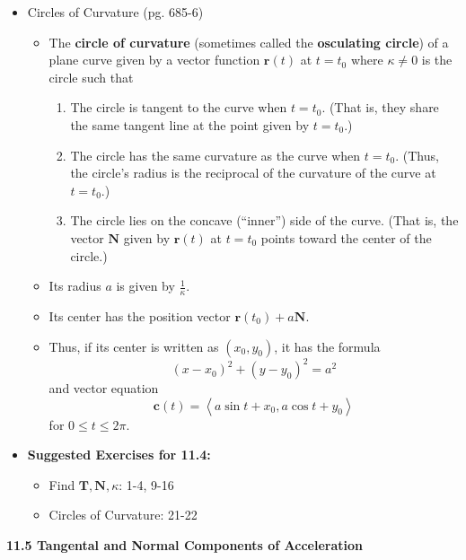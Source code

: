 \documentclass[12pt]{article}
\renewcommand{\vec}[1]{\mathbf{#1}}
\newcommand{\<}{\left<}
\renewcommand{\>}{\right>}
\begin{document}
\begin{itemize}
  \item Circles of Curvature (pg. 685-6)
  
    \begin{itemize}
    \item The \textbf{circle of curvature} (sometimes called the \textbf{osculating circle}) of a plane curve given by a vector function $\vec{r}(t)$ at $t=t_0$ where $\kappa\not=0$ is the circle such that
      \begin{enumerate}
      \item The circle is tangent to the curve when $t=t_0$. (That is, they share the same tangent line at the point given by $t=t_0$.)
      \item The circle has the same curvature as the curve when $t=t_0$. (Thus, the circle's radius is the reciprocal of the curvature of the curve at $t=t_0$.)
      \item The circle lies on the concave (``inner'') side of the curve. (That is, the vector $\vec{N}$ given by $\vec{r}(t)$ at $t=t_0$ points toward the center of the circle.)
      \end{enumerate}
    \item Its radius $a$ is given by $\displaystyle\frac{1}{\kappa}$.
    \item Its center has the position vector $\vec{r}(t_0)+a\vec{N}$.
    \item Thus, if its center is written as $(x_0,y_0)$, it has the formula \[(x-x_0)^2+(y-y_0)^2=a^2\] and vector equation \[\vec{c}(t) = \<a\sin t+x_0,a\cos t+y_0\>\] for $0\leq t\leq 2\pi$.
    \end{itemize}
    
  \item \textbf{ Suggested Exercises for 11.4:}
  
    \begin{itemize}
    \item Find $\vec{T},\vec{N},\kappa$: 1-4, 9-16
    \item Circles of Curvature: 21-22
    \end{itemize}
    
  \end{itemize}
  
  \newpage
  
  \centerline{\bf 11.5 Tangental and Normal Components of Acceleration}
  
\end{document}
